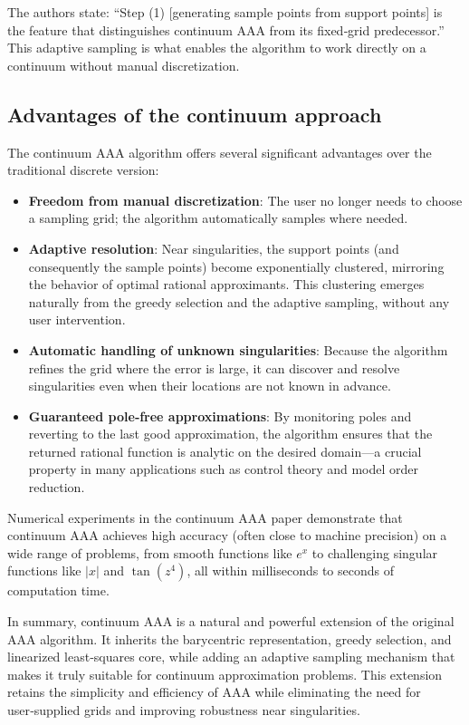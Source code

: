 \documentclass{article}
\begin{document}
The authors state: ``Step (1) [generating sample points from support points] is the feature that distinguishes continuum AAA from its fixed‑grid predecessor.'' This adaptive sampling is what enables the algorithm to work directly on a continuum without manual discretization.

\subsection{Advantages of the continuum approach}

The continuum AAA algorithm offers several significant advantages over the traditional discrete version:

\begin{itemize}
    \item \textbf{Freedom from manual discretization}: The user no longer needs to choose a sampling grid; the algorithm automatically samples where needed.
    \item \textbf{Adaptive resolution}: Near singularities, the support points (and consequently the sample points) become exponentially clustered, mirroring the behavior of optimal rational approximants. This clustering emerges naturally from the greedy selection and the adaptive sampling, without any user intervention.
    \item \textbf{Automatic handling of unknown singularities}: Because the algorithm refines the grid where the error is large, it can discover and resolve singularities even when their locations are not known in advance.
    \item \textbf{Guaranteed pole‑free approximations}: By monitoring poles and reverting to the last good approximation, the algorithm ensures that the returned rational function is analytic on the desired domain—a crucial property in many applications such as control theory and model order reduction.
\end{itemize}

Numerical experiments in the continuum AAA paper demonstrate that continuum AAA achieves high accuracy (often close to machine precision) on a wide range of problems, from smooth functions like \(e^x\) to challenging singular functions like \(|x|\) and \(\tan(z^4)\), all within milliseconds to seconds of computation time.

In summary, continuum AAA is a natural and powerful extension of the original AAA algorithm. It inherits the barycentric representation, greedy selection, and linearized least‑squares core, while adding an adaptive sampling mechanism that makes it truly suitable for continuum approximation problems. This extension retains the simplicity and efficiency of AAA while eliminating the need for user‑supplied grids and improving robustness near singularities.
\end{document}
